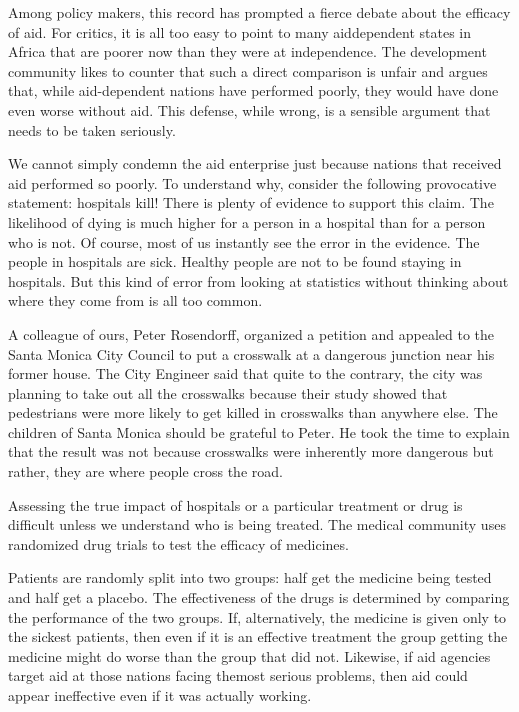 \documentclass[10pt]{article}
\begin{document}
{\large Among policy makers, this record has prompted a fierce debate about the
efficacy of aid. For critics, it is all too easy to point to many aiddependent
states in Africa that are poorer now than they were at independence. The
development community likes to counter that such a direct comparison is unfair
and argues that, while aid-dependent nations have performed poorly, they would
have done even worse without aid. This defense, while wrong, is a sensible
argument that needs to be taken seriously.}

{\large We cannot simply condemn the aid enterprise just because nations that
received aid performed so poorly. To understand why, consider the following
provocative statement: hospitals kill! There is plenty of evidence to support
this claim. The likelihood of dying is much higher for a person in a hospital
than for a person who is not. Of course, most of us instantly see the error in
the evidence. The people in hospitals are sick. Healthy people are not to be
found staying in hospitals. But this kind of error from looking at statistics
without thinking about where they come from is all too common.}

{\large A colleague of ours, Peter Rosendorff, organized a petition and appealed
to the Santa Monica City Council to put a crosswalk at a dangerous junction near
his former house. The City Engineer said that quite to the contrary, the city was
planning to take out all the crosswalks because their study showed that
pedestrians were more likely to get killed in crosswalks than anywhere else. The
children of Santa Monica should be grateful to Peter. He took the time to explain
that the result was not because crosswalks were inherently more dangerous but
rather, they are where people cross the road.}

{\large Assessing the true impact of hospitals or a particular treatment or drug
is difficult unless we understand who is being treated. The medical community
uses randomized drug trials to test the efficacy of medicines.}

{\large Patients are randomly split into two groups: half get the medicine being
tested and half get a placebo. The effectiveness of the drugs is determined by
comparing the performance of the two groups. If, alternatively, the medicine is
given only to the sickest patients, then even if it is an effective treatment the
group getting the medicine might do worse than the group that did not. Likewise,
if aid agencies target aid at those nations facing themost serious problems, then
aid could appear ineffective even if it was actually working.}
\end{document}
